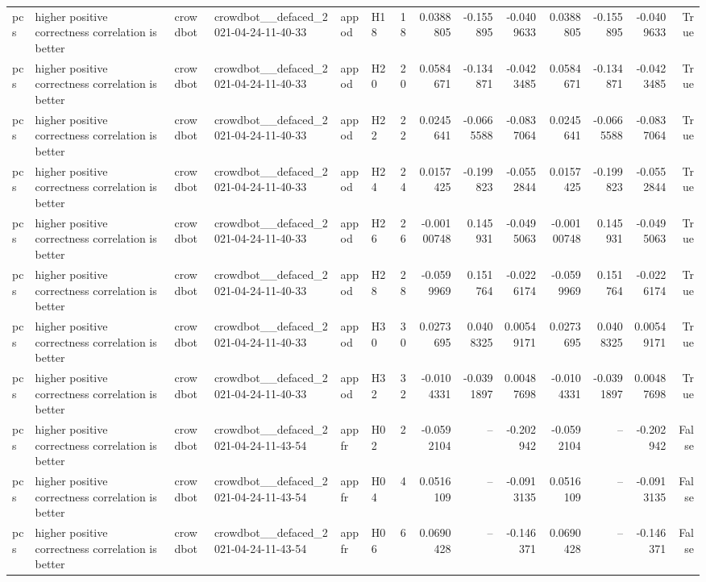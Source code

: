 \begin{longtable}{llllllrrrrrrrr}
pcs & higher positive correctness correlation is better & crowdbot & crowdbot\_\_defaced\_2021-04-24-11-40-33 & appod & H18 & 18 & 0.0388805 & -0.155895 & -0.0409633 & 0.0388805 & -0.155895 & -0.0409633 & True \\
pcs & higher positive correctness correlation is better & crowdbot & crowdbot\_\_defaced\_2021-04-24-11-40-33 & appod & H20 & 20 & 0.0584671 & -0.134871 & -0.0423485 & 0.0584671 & -0.134871 & -0.0423485 & True \\
pcs & higher positive correctness correlation is better & crowdbot & crowdbot\_\_defaced\_2021-04-24-11-40-33 & appod & H22 & 22 & 0.0245641 & -0.0665588 & -0.0837064 & 0.0245641 & -0.0665588 & -0.0837064 & True \\
pcs & higher positive correctness correlation is better & crowdbot & crowdbot\_\_defaced\_2021-04-24-11-40-33 & appod & H24 & 24 & 0.0157425 & -0.199823 & -0.0552844 & 0.0157425 & -0.199823 & -0.0552844 & True \\
pcs & higher positive correctness correlation is better & crowdbot & crowdbot\_\_defaced\_2021-04-24-11-40-33 & appod & H26 & 26 & -0.00100748 & 0.145931 & -0.0495063 & -0.00100748 & 0.145931 & -0.0495063 & True \\
pcs & higher positive correctness correlation is better & crowdbot & crowdbot\_\_defaced\_2021-04-24-11-40-33 & appod & H28 & 28 & -0.0599969 & 0.151764 & -0.0226174 & -0.0599969 & 0.151764 & -0.0226174 & True \\
pcs & higher positive correctness correlation is better & crowdbot & crowdbot\_\_defaced\_2021-04-24-11-40-33 & appod & H30 & 30 & 0.0273695 & 0.0408325 & 0.00549171 & 0.0273695 & 0.0408325 & 0.00549171 & True \\
pcs & higher positive correctness correlation is better & crowdbot & crowdbot\_\_defaced\_2021-04-24-11-40-33 & appod & H32 & 32 & -0.0104331 & -0.0391897 & 0.00487698 & -0.0104331 & -0.0391897 & 0.00487698 & True \\
pcs & higher positive correctness correlation is better & crowdbot & crowdbot\_\_defaced\_2021-04-24-11-43-54 & appfr & H02 & 2 & -0.0592104 & -- & -0.202942 & -0.0592104 & -- & -0.202942 & False \\
pcs & higher positive correctness correlation is better & crowdbot & crowdbot\_\_defaced\_2021-04-24-11-43-54 & appfr & H04 & 4 & 0.0516109 & -- & -0.0913135 & 0.0516109 & -- & -0.0913135 & False \\
pcs & higher positive correctness correlation is better & crowdbot & crowdbot\_\_defaced\_2021-04-24-11-43-54 & appfr & H06 & 6 & 0.0690428 & -- & -0.146371 & 0.0690428 & -- & -0.146371 & False \\

\end{longtable}
